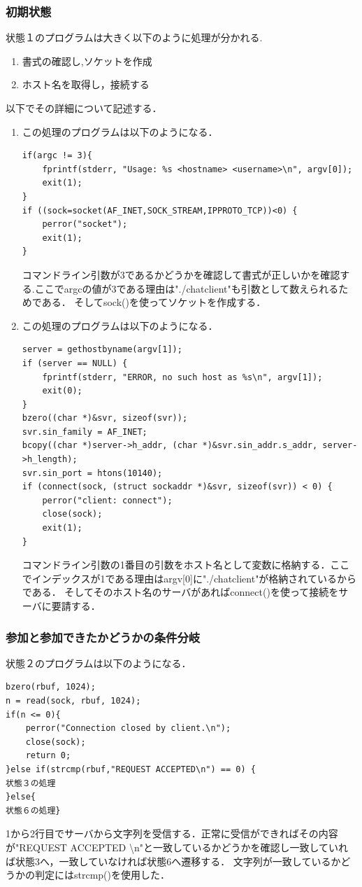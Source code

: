 \documentclass[dvipdfmx]{jarticle}
\begin{document}
\subsubsection{初期状態}
状態１のプログラムは大きく以下のように処理が分かれる.
\begin{enumerate}
    \item 書式の確認し,ソケットを作成
    \item ホスト名を取得し，接続する
\end{enumerate}
以下でその詳細について記述する．
\begin{enumerate}
    \item この処理のプログラムは以下のようになる．
\begin{lstlisting}
if(argc != 3){
    fprintf(stderr, "Usage: %s <hostname> <username>\n", argv[0]);
    exit(1);
}
if ((sock=socket(AF_INET,SOCK_STREAM,IPPROTO_TCP))<0) {
    perror("socket");
    exit(1);
}
\end{lstlisting}
コマンドライン引数が3であるかどうかを確認して書式が正しいかを確認する.ここでargcの値が3である理由は"./chatclient"も引数として数えられるためである．
そしてsock()を使ってソケットを作成する．
    \item この処理のプログラムは以下のようになる．
\begin{lstlisting}
server = gethostbyname(argv[1]);
if (server == NULL) {
    fprintf(stderr, "ERROR, no such host as %s\n", argv[1]);
    exit(0);
}
bzero((char *)&svr, sizeof(svr));
svr.sin_family = AF_INET;
bcopy((char *)server->h_addr, (char *)&svr.sin_addr.s_addr, server->h_length);
svr.sin_port = htons(10140);
if (connect(sock, (struct sockaddr *)&svr, sizeof(svr)) < 0) {
    perror("client: connect");
    close(sock);
    exit(1);
}
\end{lstlisting}
コマンドライン引数の1番目の引数をホスト名として変数に格納する．ここでインデックスが1である理由はargv[0]に"./chatclient"が格納されているからである．
そしてそのホスト名のサーバがあればconnect()を使って接続をサーバに要請する．
\end{enumerate}
\subsubsection{参加と参加できたかどうかの条件分岐}
状態２のプログラムは以下のようになる．
\begin{lstlisting}
bzero(rbuf, 1024);
n = read(sock, rbuf, 1024);
if(n <= 0){
    perror("Connection closed by client.\n");
    close(sock);
    return 0;
}else if(strcmp(rbuf,"REQUEST ACCEPTED\n") == 0) {
状態３の処理
}else{
状態６の処理}
\end{lstlisting}
1から2行目でサーバから文字列を受信する．正常に受信ができればその内容が"REQUEST ACCEPTED \textbackslash n"と一致しているかどうかを確認し一致していれば状態3へ，一致していなければ状態6へ遷移する．
文字列が一致しているかどうかの判定にはstrcmp()を使用した．
\end{document}
